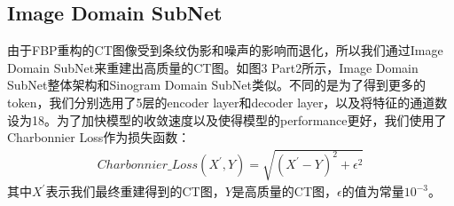 \subsection{Image Domain SubNet}
由于FBP重构的CT图像受到条纹伪影和噪声的影响而退化，所以我们通过Image Domain SubNet来重建出高质量的CT图。如图3 Part2所示，Image Domain SubNet整体架构和Sinogram Domain SubNet类似。不同的是为了得到更多的token，我们分别选用了5层的encoder layer和decoder layer，以及将特征的通道数设为18。为了加快模型的收敛速度以及使得模型的performance更好，我们使用了Charbonnier Loss\cite{2017Fast}作为损失函数：
\begin{equation}\begin{aligned}
Charbonnier\_Loss(X^{'},Y) = \sqrt{(X^{'}-Y)^{2} + \epsilon^{2}} \end{aligned}
\end{equation}
其中$X^{'}$表示我们最终重建得到的CT图，$Y$是高质量的CT图，$\epsilon$的值为常量$10^{-3}$。\par